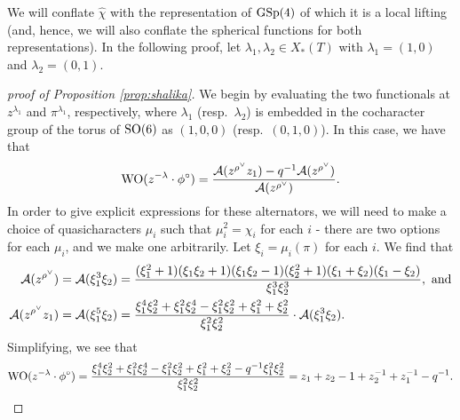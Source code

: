 \documentclass[11pt,letterpaper]{article}
\newcommand{\A}{\mathcal{A}}
\newcommand{\SO}{\textup{SO}}
\newcommand{\GSp}{\textup{GSp}}
\newcommand{\WO}{\textup{WO}}
\theoremstyle{remark}
\numberwithin{equation}{section}
\begin{document}
We will conflate $\hat{\chi}$ with the representation of $\GSp(4)$ of which it is a local lifting (and, hence, we will also conflate the spherical functions for both representations). In the following proof, let $\lambda_1,\lambda_2 \in X_{\ast}(T)$ with $\lambda_1 =  (1,0)$ and $\lambda_2 = (0,1)$.

\begin{proof}[proof of Proposition \ref{prop:shalika}]

We begin by evaluating the two functionals at $z^{\lambda_1}$ and $\pi^{\lambda_1}$, respectively, where $\lambda_1$ (resp.~$\lambda_2$) is embedded in the cocharacter group of the torus of $\SO(6)$ as $(1,0,0)$ (resp.~$(0,1,0)$). In this case, we have that $$\WO(z^{-\lambda}\cdot \phi^{\circ}) = \frac{\A(z^{\rho^{\vee}}z_1)-q^{-1}\A(z^{\rho^{\vee}})}{\A(z^{\rho^{\vee}})}.$$ In order to give explicit expressions for these alternators, we will need to make a choice of quasicharacters $\mu_i$ such that $\mu_i^2 = \chi_i$ for each $i$ - there are two options for each $\mu_i$, and we make one arbitrarily. Let $\xi_i = \mu_i(\pi)$ for each $i$. We find that 
\begin{align*}
\A(z^{\rho^{\vee}}) = \A(\xi_1^3\xi_2) &= \frac{(\xi_1^2 + 1)(\xi_1\xi_2 + 1)(\xi_1\xi_2 - 1)(\xi_2^2 + 1)(\xi_1 + \xi_2)(\xi_1 - \xi_2)}{\xi_1^3\xi_2^3}, \textup{ and}
\\ \A(z^{\rho^{\vee}}z_1) = \A(\xi_1^5\xi_2) &= \frac{\xi_1^4\xi_2^2 + \xi_1^2\xi_2^4 - \xi_1^2\xi_2^2 + \xi_1^2 + \xi_2^2}{\xi_1^2\xi_2^2}\cdot\A(\xi_1^3\xi_2).
\end{align*}
Simplifying, we see that \begin{equation}\label{wospherical} \WO(z^{-\lambda}\cdot \phi^{\circ}) = \frac{\xi_1^4\xi_2^2 + \xi_1^2\xi_2^4 - \xi_1^2\xi_2^2 + \xi_1^2 + \xi_2^2 - q^{-1}\xi_1^2\xi_2^2}{\xi_1^2\xi_2^2} = z_1+z_2-1+z_2^{-1}+z_1^{-1}-q^{-1}.\end{equation}


\end{proof}
\end{document}
